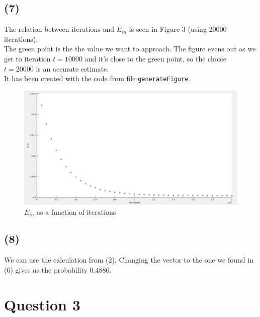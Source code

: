 \documentclass[a4paper]{article}
\begin{document}
\subsection*{(7)}
The relation between iterations and $E_{in}$ is seen in Figure 3 (using $20000$ iterations).\\
The green point is the the value we want to approach. The figure evens out as we get to iteration $t=10000$ and it's close to the green point, so the choice $t=20000$ is an accurate estimate. \\
It has been created with the code from file \texttt{generateFigure}.
\begin{figure}
\begin{center}
\includegraphics[scale=0.33]{fig3.png}
\end{center}
\caption{$E_{in}$ as a function of iterations}
\end{figure}


\subsection*{(8)}
We can use the calculation from (2). Changing the vector to the one we found in (6) gives us the probability $0.4886$.

\newpage
\section*{Question 3}
\end{document}
